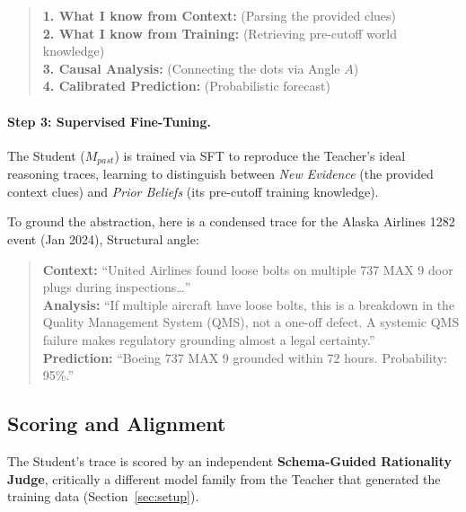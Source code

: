 \documentclass[11pt,a4paper]{article}
\begin{document}
\begin{quote}
\small
\textbf{1. What I know from Context:} (Parsing the provided clues)\\
\textbf{2. What I know from Training:} (Retrieving pre-cutoff world knowledge)\\
\textbf{3. Causal Analysis:} (Connecting the dots via Angle $A$)\\
\textbf{4. Calibrated Prediction:} (Probabilistic forecast)
\end{quote}

\paragraph{Step 3: Supervised Fine-Tuning.}
The Student ($M_{past}$) is trained via SFT to reproduce the Teacher's ideal reasoning traces, learning to distinguish between \textit{New Evidence} (the provided context clues) and \textit{Prior Beliefs} (its pre-cutoff training knowledge).

To ground the abstraction, here is a condensed trace for the Alaska Airlines 1282 event (Jan 2024), Structural angle:

\begin{quote}
\small
\textbf{Context:} ``United Airlines found loose bolts on multiple 737 MAX 9 door plugs during inspections\ldots''\\
\textbf{Analysis:} ``If multiple aircraft have loose bolts, this is a breakdown in the Quality Management System (QMS), not a one-off defect. A systemic QMS failure makes regulatory grounding almost a legal certainty.''\\
\textbf{Prediction:} ``Boeing 737 MAX 9 grounded within 72 hours. Probability: 95\%.''
\end{quote}

\subsection{Scoring and Alignment}
\label{sec:scoring}

The Student's trace is scored by an independent \textbf{Schema-Guided Rationality Judge}, critically a different model family from the Teacher that generated the training data (Section~\ref{sec:setup}).
\end{document}
